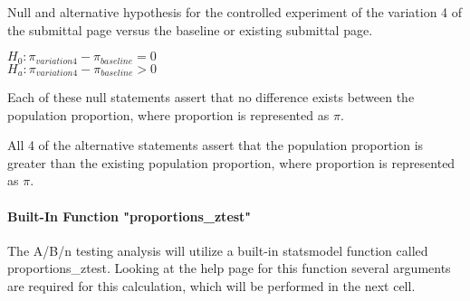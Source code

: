 \documentclass[11pt]{article}
\def\gt{>}
\begin{document}
Null and alternative hypothesis for the controlled experiment of the
variation 4 of the submittal page versus the baseline or existing
submittal page.

\(H_{0}: \pi_{variation4} - \pi_{baseline} = 0\)\\
\(H_{a}: \pi_{variation4} - \pi_{baseline} \gt 0\)

Each of these null statements assert that no difference exists between
the population proportion, where proportion is represented as \(\pi\).

All 4 of the alternative statements assert that the population
proportion is greater than the existing population proportion, where
proportion is represented as \(\pi\).

    \paragraph{Built-In Function
"proportions\_ztest"}\label{built-in-function-proportions_ztest}

    The A/B/n testing analysis will utilize a built-in statsmodel function
called proportions\_ztest. Looking at the help page for this function
several arguments are required for this calculation, which will be
performed in the next cell.
\end{document}
